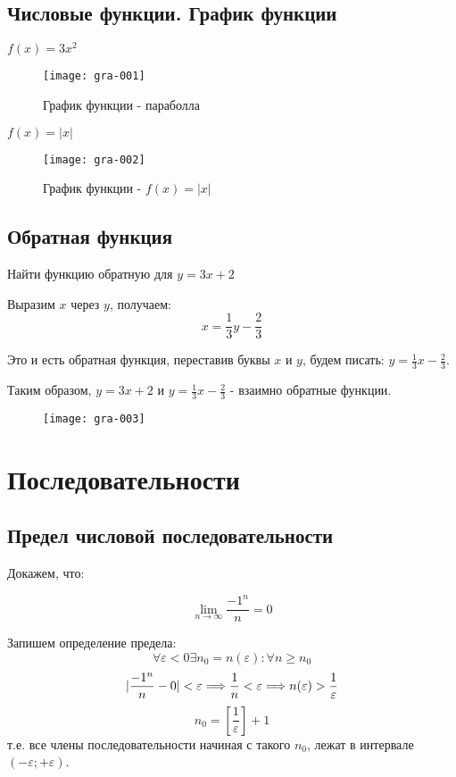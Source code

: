 \documentclass[14pt]{extreport}
\begin{document}
\section{Числовые функции. График функции}

\begin{example}
$f(x)=3x^2$
\begin{figure}[H]
\centerline{\texttt{[image: gra-001]}}
\caption{График функции - параболла}
\label{fig12}
\end{figure}
\end{example}

\begin{example}
$f(x)=|x|$
\begin{figure}[H]
\centerline{\texttt{[image: gra-002]}}
\caption{График функции - $f(x)=|x|$}
\label{fig13}
\end{figure}
\end{example}


\section{Обратная функция}
\begin{example}
Найти функцию обратную для $y=3x+2$

Выразим $x$ через $y$, получаем: 
\begin{equation}
x = \frac{1}{3}y-\frac{2}{3} 
\end{equation}

Это и есть обратная функция, переставив буквы $x$ и $y$, будем писать: $y=\frac{1}{3}x-\frac{2}{3}$.

Таким образом, $y=3x+2$ и $y=\frac{1}{3}x-\frac{2}{3}$ - взаимно обратные функции.
\begin{figure}[H]
\centerline{\texttt{[image: gra-003]}}
\caption{}
\label{fig14}
\end{figure}
\end{example}


\chapter{Последовательности}


\section{Предел числовой последовательности}
\begin{example}

Докажем, что:

$$\lim\limits_{n\to \infty}\frac{-1^n}{n}=0$$

Запишем определение предела: 
$$\forall \varepsilon<0 \exists n_0 = n(\varepsilon):\forall n \geqslant n_0 $$
$$\arrowvert\frac{-1^n}{n}-0\arrowvert<\varepsilon\Longrightarrow\frac{1}{n}<\varepsilon\Longrightarrow n(\varepsilon)>\frac{1}{\varepsilon}$$
$$n_0=[\frac{1}{\varepsilon}]+1$$
т.е. все члены последовательности начиная с такого $n_0$, лежат в интервале $(-\varepsilon; +\varepsilon)$.
\end{example}
\end{document}
